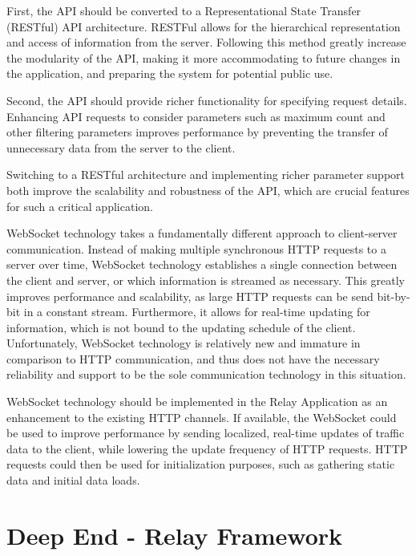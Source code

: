 \documentclass{report}
\begin{document}
First, the API should be converted to a Representational State Transfer (RESTful) API architecture. RESTFul allows for the hierarchical representation and access of information from the server. Following this method greatly increase the modularity of the API, making it more accommodating to future changes in the application, and preparing the system for potential public use.

Second, the API should provide richer functionality for specifying request details. Enhancing API requests to consider parameters such as maximum count and other filtering parameters improves performance by preventing the transfer of unnecessary data from the server to the client.

Switching to a RESTful architecture and implementing richer parameter support both improve the scalability and robustness of the API, which are crucial features for such a critical application.

WebSocket technology takes a fundamentally different approach to client-server communication. Instead of making multiple synchronous HTTP requests to a server over time, WebSocket technology establishes a single connection between the client and server, or which information is streamed as necessary. This greatly improves performance and scalability, as large HTTP requests can be send bit-by-bit in a constant stream. Furthermore, it allows for real-time updating for information, which is not bound to the updating schedule of the client. Unfortunately, WebSocket technology is relatively new and immature in comparison to HTTP communication, and thus does not have the necessary reliability and support to be the sole communication technology in this situation.

WebSocket technology should be implemented in the Relay Application as an enhancement to the existing HTTP channels. If available, the WebSocket could be used to improve performance by sending localized, real-time updates of traffic data to the client, while lowering the update frequency of HTTP requests. HTTP requests could then be used for initialization purposes, such as gathering static data and initial data loads.

\section{Deep End - Relay Framework}
\end{document}
